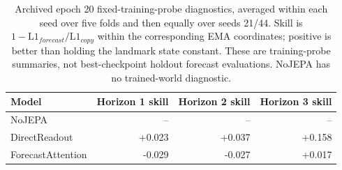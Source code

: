 \begin{table}[t]
\centering
\small
\caption{Archived epoch 20 fixed-training-probe diagnostics, averaged within each seed over five folds and then equally over seeds 21/44. Skill is $1-\mathrm{L1}_{forecast}/\mathrm{L1}_{copy}$ within the corresponding EMA coordinates; positive is better than holding the landmark state constant. These are training-probe summaries, not best-checkpoint holdout forecast evaluations. NoJEPA has no trained-world diagnostic.}
\label{tab:worldprobe}
\begin{tabular}{lrrr}
\toprule
Model & Horizon 1 skill & Horizon 2 skill & Horizon 3 skill \\
\midrule
NoJEPA & -- & -- & -- \\
DirectReadout & +0.023 & +0.037 & +0.158 \\
ForecastAttention & -0.029 & -0.027 & +0.017 \\
\bottomrule
\end{tabular}
\end{table}
